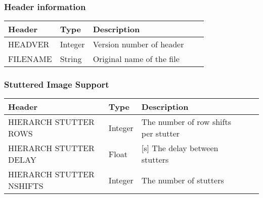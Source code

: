 \subsubsection{Header information}
\begin{tabular}{l l l l l}

\hline
Header & Type & Description \\
\hline
HEADVER & Integer & Version number of header \\
FILENAME & String & Original name of the file \\
\hline
\end{tabular}


\subsubsection{Stuttered Image Support}
\begin{tabular}{l l l l l}

\hline
Header & Type & Description \\
\hline
HIERARCH STUTTER ROWS & Integer & The number of row shifts per stutter \\
HIERARCH STUTTER DELAY & Float & [s] The delay between stutters \\
HIERARCH STUTTER NSHIFTS & Integer & The number of stutters \\
\hline
\end{tabular}

